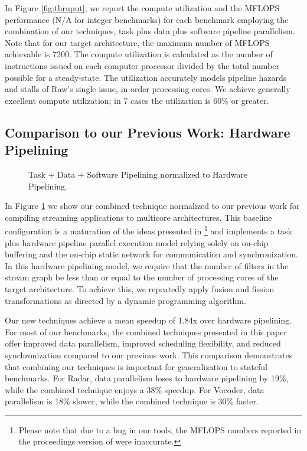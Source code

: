 In Figure \ref{fig:thruput}, we report the compute utilization and the
MFLOPS performance (N/A for integer benchmarks) for each benchmark
employing the combination of our techniques, task plus data plus
software pipeline parallelism. Note that for our target architecture,
the maximum number of MFLOPS achievable is 7200.  The compute
utilization is calculated as the number of instructions issued on each
computer processor divided by the total number possible for a
steady-state.  The utilization accurately models pipeline hazards and
stalls of Raw's single issue, in-order processing cores.  We achieve
generally excellent compute utilization; in 7 cases the utilization is
60\% or greater.


\subsection{Comparison to our Previous Work: Hardware Pipelining}

\begin{figure}[t]
\vspace{-6pt}
\centering
{}
\caption{Task + Data + Software Pipelining normalized to Hardware Pipelining.
\protect\label{fig:vs-space}}
\vspace{-6pt}
\end{figure}

In Figure \ref{fig:vs-space} we show our combined technique normalized
to our previous work for compiling streaming applications to multicore
architectures.  This baseline configuration is a maturation of the
ideas presented in \cite{streamit-asplos}\footnote{Please note that
due to a bug in our tools, the MFLOPS numbers reported in the
proceedings version of \cite{streamit-asplos} were inaccurate.} and
implements a task plus hardware pipeline parallel execution model
relying solely on on-chip buffering and the on-chip static network for
communication and synchronization. In this hardware pipelining model,
we require that the number of filters in the stream graph be less than
or equal to the number of processing cores of the target architecture.
To achieve this, we repeatedly apply fusion and fission
transformations as directed by a dynamic programming algorithm.

Our new techniques achieve a mean speedup of 1.84x over hardware
pipelining.
For most of our benchmarks, the combined techniques presented in this
paper offer improved data parallelism, improved scheduling
flexibility, and reduced synchronization compared to our previous
work. This comparison demonstrates that combining our techniques is
important for generalization to stateful benchmarks.  For Radar, data
parallelism loses to hardware pipelining by 19\%, while the combined
technique enjoys a 38\% speedup. For Vocoder, data parallelism is 18\%
slower, while the combined technique is 30\% faster.

